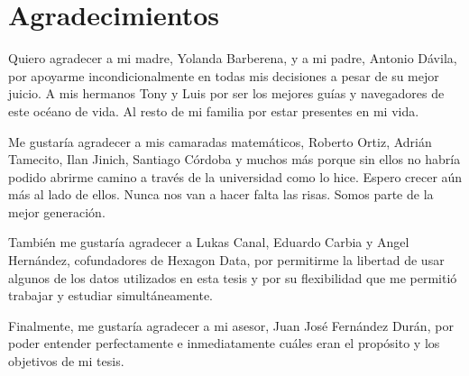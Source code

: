 \chapter*{Agradecimientos}
Quiero agradecer a mi madre, Yolanda Barberena, y a mi padre, Antonio Dávila, por apoyarme incondicionalmente en todas mis decisiones a pesar de su mejor juicio. A mis hermanos Tony y Luis por ser los mejores guías y navegadores de este océano de vida. Al resto de mi familia por estar presentes en mi vida.

Me gustaría agradecer a mis camaradas matemáticos, Roberto Ortiz, Adrián Tamecito, Ilan Jinich, Santiago Córdoba y muchos más porque sin ellos no habría podido abrirme camino a través de la universidad como lo hice. Espero crecer aún más al lado de ellos. Nunca nos van a hacer falta las risas. Somos parte de la mejor generación.

También me gustaría agradecer a Lukas Canal, Eduardo Carbia y Angel Hernández, cofundadores de Hexagon Data, por permitirme la libertad de usar algunos de los datos utilizados en esta tesis y por su flexibilidad que me permitió trabajar y estudiar simultáneamente.

Finalmente, me gustaría agradecer a mi asesor, Juan José Fernández Durán, por poder entender perfectamente e inmediatamente cuáles eran el propósito y los objetivos de mi tesis.

\clearpage

